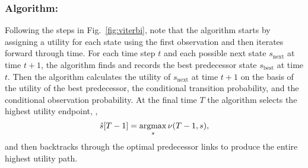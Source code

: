 \subsubsection*{Algorithm:}
Following the steps in Fig.~\ref{fig:viterbi}, note that the algorithm
starts by assigning a utility for each state using the first
observation and then iterates forward through time.  For each time
step $t$ and each possible next state $s_\text{next}$ at time $t+1$,
the algorithm finds and records the best predecessor state $s_\text{best}$
at time $t$.  Then the algorithm calculates the utility of
$s_\text{next}$ at time $t+1$ on the basis of the utility of the best
predecessor, the conditional transition probability, and the
conditional observation probability.  At the final time $T$ the
algorithm selects the highest utility endpoint, \ie,
\begin{equation*}
  {\hat s}{[T-1]} = \operatorname*{argmax}_s \nu(T-1,s),
\end{equation*}
and then backtracks through the optimal predecessor links to produce
the entire highest utility path.
